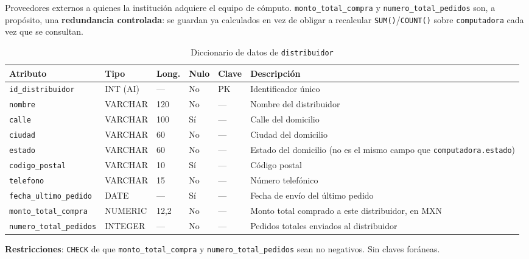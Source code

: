 \documentclass[10pt,a4paper]{article}
\begin{document}
Proveedores externos a quienes la institución adquiere el equipo de cómputo. \texttt{monto\_\allowbreak total\_\allowbreak compra} y \texttt{numero\_\allowbreak total\_\allowbreak pedidos} son, a propósito, una \textbf{redundancia controlada}: se guardan ya calculados en vez de obligar a recalcular \texttt{SUM()}/\texttt{COUNT()} sobre \texttt{computadora} cada vez que se consultan.

\begin{table}[H]
	\centering
	\footnotesize
	\begin{tabular}{p{2.9cm} | p{1.6cm} | p{0.8cm} | p{0.7cm} | p{1cm} | p{7.2cm}}\hline \hline
		\textbf{Atributo} & \textbf{Tipo} & \textbf{Long.} & \textbf{Nulo} & \textbf{Clave} & \textbf{Descripción} \\ \hline \hline
		\texttt{id\_distribuidor} & INT (AI) & --- & No & PK & Identificador único \\ \hline
		\texttt{nombre} & VARCHAR & 120 & No & --- & Nombre del distribuidor \\ \hline
		\texttt{calle} & VARCHAR & 100 & Sí & --- & Calle del domicilio \\ \hline
		\texttt{ciudad} & VARCHAR & 60 & No & --- & Ciudad del domicilio \\ \hline
		\texttt{estado} & VARCHAR & 60 & No & --- & Estado del domicilio (no es el mismo campo que \texttt{computadora.estado}) \\ \hline
		\texttt{codigo\_postal} & VARCHAR & 10 & Sí & --- & Código postal \\ \hline
		\texttt{telefono} & VARCHAR & 15 & No & --- & Número telefónico \\ \hline
		\texttt{fecha\_ultimo\_pedido} & DATE & --- & Sí & --- & Fecha de envío del último pedido \\ \hline
		\texttt{monto\_total\_compra} & NUMERIC & 12,2 & No & --- & Monto total comprado a este distribuidor, en MXN \\ \hline
		\texttt{numero\_total\_pedidos} & INTEGER & --- & No & --- & Pedidos totales enviados al distribuidor \\ \hline \hline
	\end{tabular}
	\caption{Diccionario de datos de \texttt{distribuidor}}
	\label{tabla:dic-distribuidor}
\end{table}

\textbf{Restricciones}: \texttt{CHECK} de que \texttt{monto\_total\_compra} y \texttt{numero\_total\_pedidos} sean no negativos. Sin claves foráneas.

\end{document}
